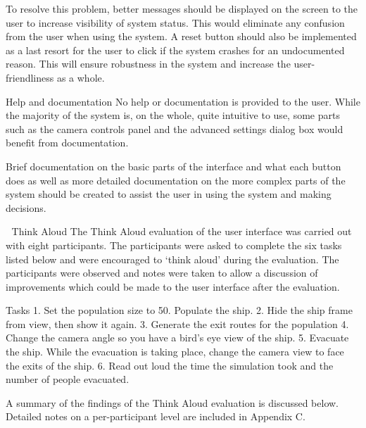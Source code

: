 \documentclass{article}
\begin{document}
To resolve this problem, better messages should be displayed on the screen to the user to increase visibility of system status. This would eliminate any confusion from the user when using the system. A reset button should also be implemented as a last resort for the user to click if the system crashes for an undocumented reason. This will ensure robustness in the system and increase the user-friendliness as a whole.

Help and documentation
No help or documentation is provided to the user. While the majority of the system is, on the whole, quite intuitive to use, some parts such as the camera controls panel and the advanced settings dialog box would benefit from documentation.

Brief documentation on the basic parts of the interface and what each button does as well as more detailed documentation on the more complex parts of the system should be created to assist the user in using the system and making decisions.


Think Aloud
The Think Aloud evaluation of the user interface was carried out with eight participants. The participants were asked to complete the six tasks listed below and were encouraged to ‘think aloud’ during the evaluation. The participants were observed and notes were taken to allow a discussion of improvements which could be made to the user interface after the evaluation.

Tasks
1. Set the population size to 50. Populate the ship.
2. Hide the ship frame from view, then show it again.
3. Generate the exit routes for the population
4. Change the camera angle so you have a bird’s eye view of the ship.
5. Evacuate the ship. While the evacuation is taking place, change the camera view to face the exits of the ship.
6. Read out loud the time the simulation took and the number of people evacuated.

A summary of the findings of the Think Aloud evaluation is discussed below. Detailed notes on a per-participant level are included in Appendix C.
\end{document}
